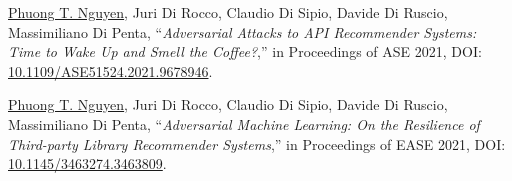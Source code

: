 \documentclass[a4paper,8pt]{article} %
\begin{document}
\begin{thebibliography}{100}
	
	
	
	
	\underline{Phuong T. Nguyen}, Juri Di Rocco, Claudio Di Sipio, Davide Di Ruscio, Massimiliano Di Penta, ``\emph{Adversarial Attacks to API Recommender Systems: Time to Wake Up and Smell the Coffee?},'' in Proceedings %
	of ASE 2021, DOI: \href{https://doi.org/10.1109/ASE51524.2021.9678946}{10.1109/ASE51524.2021.9678946}.%
		
	\underline{Phuong T. Nguyen}, Juri Di Rocco, Claudio Di Sipio, Davide Di Ruscio, Massimiliano Di Penta, ``\emph{Adversarial Machine Learning: On the Resilience of Third-party Library Recommender Systems},'' in Proceedings of EASE 2021, DOI: \href{https://doi.org/10.1145/3463274.3463809}{10.1145/3463274.3463809}.
	
%	
%		
		
	

\end{thebibliography}
\end{document}
